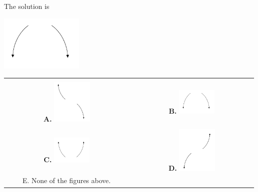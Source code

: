 \documentclass{article}[14pt]
\begin{document}
 
 The solution is  
 \begin{center} \includegraphics[width=0.3\textwidth]{../Figures/endBehaviorNegativeEvenA.png} \end{center}\begin{tabular}{|c|c|} 
\hline 
 & \tabularnewline 
 \textbf{A.} \includegraphics[width=0.3\textwidth]{../Figures/endBehaviorNegativeOddA.png} & \textbf{B.} \includegraphics[width=0.3\textwidth]{../Figures/endBehaviorNegativeEvenA.png} \tabularnewline 
\hline 
 & \tabularnewline 
 \textbf{C.} \includegraphics[width=0.3\textwidth]{../Figures/endBehaviorPositiveEvenA.png} & \textbf{D.} \includegraphics[width=0.3\textwidth]{../Figures/endBehaviorPositiveOddA.png} \tabularnewline 
\hline 
 E. None of the figures above. & \tabularnewline 
\hline 
 \end{tabular} 
 
\end{document}
